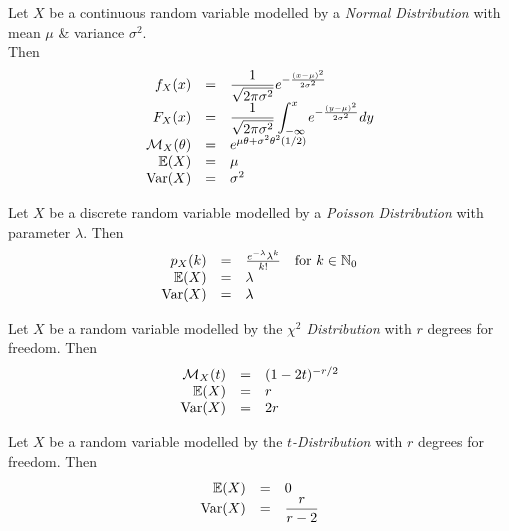 \documentclass[11pt,a4paper]{article}
\begin{document}
Let $X$ be a continuous random variable modelled by a \textit{Normal Distribution} with mean $\mu$ \& variance $\sigma^2$.\\
Then
\[\begin{array}{rcl}
f_X(x)&=&\dfrac{1}{\sqrt{2\pi\sigma^2}}e^{-\frac{(x-\mu)^2}{2\sigma^2}}\\
F_X(x)&=&\displaystyle{\dfrac{1}{\sqrt{2\pi\sigma^2}}\int_{-\infty}^xe^{-\frac{(y-\mu)^2}{2\sigma^2}}dy}\\
\mathcal{M}_X(\theta)&=&e^{\mu\theta+\sigma^2\theta^2(1/2)}\\
\mathbb{E}(X)&=&\mu\\
\mathrm{Var}(X)&=&\sigma^2
\end{array}\]

Let $X$ be a discrete random variable modelled by a \textit{Poisson Distribution} with parameter $\lambda$. Then
\[\begin{array}{rcll}
p_X(k)&=&\frac{e^{-\lambda}\lambda^k}{k!}&\mathrm{for\ }k\in\mathbb{N}_0\\
\expect(X)&=&\lambda\\
\var(X)&=&\lambda
\end{array}\]

Let $X$ be a random variable modelled by the \textit{$\chi^2$ Distribution} with $r$ degrees for freedom. Then
\[\begin{array}{rcl}
\mathcal{M}_X(t)&=&(1-2t)^{-r/2}\\
\mathbb{E}(X)&=&r\\
\mathrm{Var}(X)&=&2r
\end{array}\]

Let $X$ be a random variable modelled by the \textit{$t$-Distribution} with $r$ degrees for freedom. Then
\[\begin{array}{rcl}
\mathbb{E}(X)&=&0\\
\mathrm{Var}(X)&=&\dfrac{r}{r-2}
\end{array}\]
\end{document}
